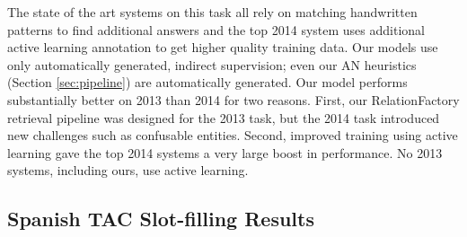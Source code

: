 The state of the art systems on this task all rely on matching handwritten patterns to find additional answers and the top 2014 system uses additional active learning annotation to get higher quality training data. Our models use only automatically generated, indirect supervision; even our AN heuristics (Section \ref{sec:pipeline}) are automatically generated. Our model performs substantially better on 2013 than 2014 for two reasons. First, our RelationFactory\citep{roth2014relationfactory} retrieval pipeline was designed for the 2013 task, but the 2014 task introduced new challenges such as confusable entities. Second, improved training using active learning gave the top 2014 systems a very large boost in performance. No 2013 systems, including ours, use active learning.



\subsection{Spanish TAC Slot-filling Results \label{sec:qual-anal}}

